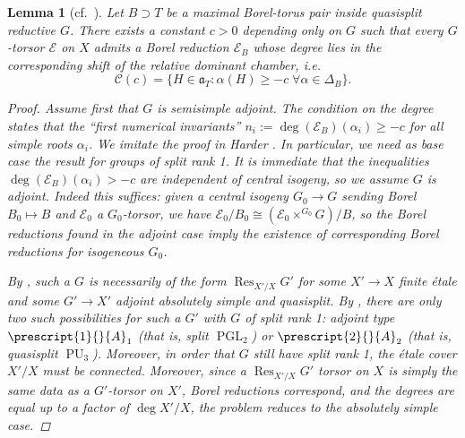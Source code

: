 \documentclass[openany]{amsbook}
\newtheorem{lemma}[theorem]{Lemma}
\theoremstyle{definition}
\theoremstyle{remark}
\numberwithin{equation}{section}
\newcommand{\cE}{\mathcal{E}}
\renewcommand{\-}{\operatorname{-}}
\renewcommand{\a}{\mathfrak{a}}
\newcommand{\on}[1]{\operatorname{#1}}
\begin{document}
\begin{lemma}[{{cf.\ \cite[Prop. 6.1.6]{CLI}}}]
    Let $B \supset T$ be a maximal Borel-torus pair inside quasisplit reductive $G$. There exists a constant $c > 0$ depending only on $G$ such that every $G$-torsor $\cE$ on $X$ admits a Borel reduction $\cE_B$ whose degree lies in the corresponding shift of the relative dominant chamber, i.e.
    $$
        \mathcal{C}(c) = \{H \in \a_T : \alpha(H) \ge -c \; \forall \alpha \in \Delta_B \}.
    $$
    \begin{proof}
        Assume first that $G$ is semisimple adjoint. The condition on the degree states that the ``first numerical invariants'' $n_i := \deg(\cE_B)(\alpha_i) \ge -c$ for all simple roots $\alpha_i$. We imitate the proof in Harder \cite[Satz 2.2.6]{harderborels}. In particular, we need as base case the result for groups of split rank 1. It is immediate that the inequalities $\deg(\cE_B)(\alpha_i) > -c$ are independent of central isogeny, so we assume $G$ is adjoint. Indeed this suffices: given a central isogeny $G_0 \to G$ sending Borel $B_0 \mapsto B$ and $\cE_0$ a $G_0$-torsor, we have $\cE_0/B_0 \cong (\cE_0 \times^{G_0} G)/B$, so the Borel reductions found in the adjoint case imply the existence of corresponding Borel reductions for isogeneous $G_0$.
        
        By \cite[Prop. 6.4.4]{conradrgs}, such a $G$ is necessarily of the form $\on{Res}_{X'/X} G'$ for some $X' \to X$ finite \'etale and some $G' \to X'$ adjoint absolutely simple and quasisplit. By \cite{titsclass}, there are only two such possibilities for such a $G'$ with $G$ of split rank 1: adjoint type $\prescript{1}{}{A}_1$ (that is, split $\on{PGL}_2$) or $\prescript{2}{}{A}_2$ (that is, quasisplit $\on{PU}_3$). Moreover, in order that $G$ still have split rank 1, the \'etale cover $X'/X$ must be connected. Moreover, since a $\on{Res}_{X'/X} G'$ torsor on $X$ is simply the same data as a $G'$-torsor on $X'$, Borel reductions correspond, and the degrees are equal up to a factor of $\deg X'/X$, the problem reduces to the absolutely simple case. 


\end{proof}
\end{lemma}
\end{document}
